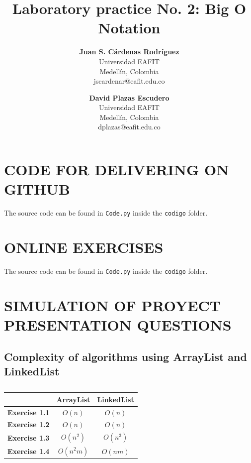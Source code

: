 \documentclass[a4paper,12pt]{article}
\title{\color{Eblue}\textbf{Laboratory practice No. 2: Big O Notation}}
\author{
  \textbf{Juan S. Cárdenas Rodríguez}\\
  Universidad EAFIT\\
  Medellín, Colombia\\
  jscardenar@eafit.edu.co
\and
  \textbf{David Plazas Escudero}\\
  Universidad EAFIT\\
  Medellín, Colombia\\
  dplazas@eafit.edu.co
}
\begin{document}
  \maketitle
  \thispagestyle{fancy}

  \section{CODE FOR DELIVERING ON GITHUB}
  The source code can be found in \texttt{Code.py} inside the \texttt{codigo} folder.

  \section{ONLINE EXERCISES}
  The source code can be found in \texttt{Code.py} inside the \texttt{codigo} folder.

  \section{SIMULATION OF PROYECT PRESENTATION QUESTIONS}
    \subsection{Complexity of algorithms using ArrayList and LinkedList}
      \begin{table}[H]
      \centering
      \caption{}
      \begin{tabular}{ccc}
        \hline
        \textbf{}             & \textbf{ArrayList} & \textbf{LinkedList} \\ \hline
        \textbf{Exercise 1.1} & $O(n)$             & $O(n)$              \\
        \textbf{Exercise 1.2} & $O(n)$             & $O(n)$              \\
        \textbf{Exercise 1.3} & $O(n^2)$           & $O(n^3)$            \\
        \textbf{Exercise 1.4} & $O(n^2m)$          & $O(nm)$             \\ \hline
        \end{tabular}
      \end{table}
\end{document}
